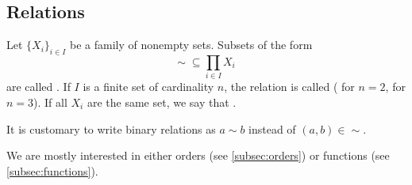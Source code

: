 \subsection{Relations}\label{subsec:relations}

\begin{definition}\label{def:relation}
  Let \( \{ X_i \}_{i \in I} \) be a family of nonempty sets.
  Subsets of the form
  \begin{equation*}
    \sim\; \subseteq \prod_{i \in I} X_i
  \end{equation*}
  are called . If \( I \) is a finite set of cardinality \( n \), the relation is called  ( for \( n = 2 \),  for \( n = 3 \)). If all \( X_i \) are the same set, we say that .

  It is customary to write binary relations as \( a \sim b \) instead of \( (a, b) \in \sim \).
\end{definition}

\begin{remark}\label{remark:main_relation_types}
  We are mostly interested in either orders (see \cref{subsec:orders}) or functions (see \cref{subsec:functions}).
\end{remark}

